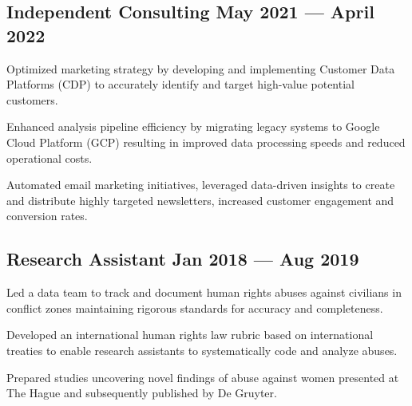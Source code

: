 \documentclass[singlesided, paper=a4, fontsize=10.5pt]{testing-class}
\begin{document}
{    %
    \vspace{0.29cm}
    \subsection{Independent Consulting \hfill May 2021 --- April 2022}
    \begin{zitemize}
        \item Optimized marketing strategy by developing and implementing Customer Data Platforms (CDP) to accurately identify and target high-value potential customers.
        \item Enhanced analysis pipeline efficiency by migrating legacy systems to Google Cloud Platform (GCP) resulting in improved data processing speeds and reduced operational costs.
        \item Automated email marketing initiatives, leveraged data-driven insights to create and distribute highly targeted newsletters, increased customer engagement and conversion rates.
    \end{zitemize}
    
    \vspace{0.29cm}

    \subsection{Research Assistant \hfill Jan 2018 --- Aug 2019}
    \begin{zitemize}
        \item Led a data team to track and document human rights abuses against civilians in conflict zones maintaining rigorous standards for accuracy and completeness.
        \item Developed an international human rights law rubric based on international treaties to enable research assistants to systematically code and analyze abuses.
        \item Prepared studies uncovering novel findings of abuse against women presented at The Hague and subsequently published by De Gruyter.

    \end{zitemize}



}
\end{document}
